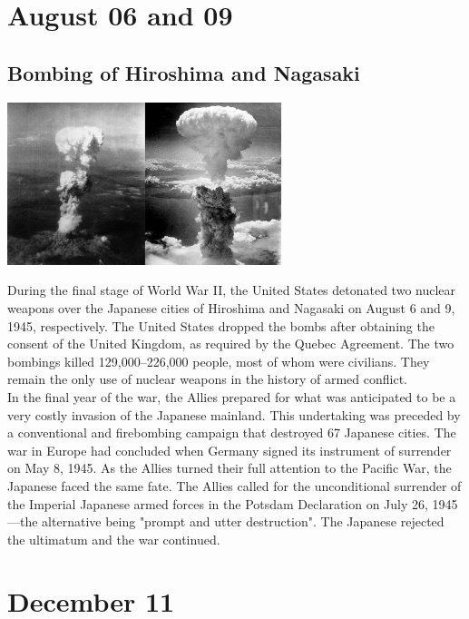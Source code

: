 \documentclass[11pt]{report}
\begin{document}
\section{August 06 and 09}
\subsection{Bombing of Hiroshima and Nagasaki}
\vspace{2mm}\begin{center}\includegraphics[width=8cm]{./img/hiroNagabombing.jpg}\end{center}
During the final stage of World War II, the United States detonated two nuclear weapons over the Japanese cities of Hiroshima and Nagasaki on August 6 and 9, 1945, respectively. The United States dropped the bombs after obtaining the consent of the United Kingdom, as required by the Quebec Agreement. The two bombings killed 129,000–226,000 people, most of whom were civilians. They remain the only use of nuclear weapons in the history of armed conflict.\\
\indent In the final year of the war, the Allies prepared for what was anticipated to be a very costly invasion of the Japanese mainland. This undertaking was preceded by a conventional and firebombing campaign that destroyed 67 Japanese cities. The war in Europe had concluded when Germany signed its instrument of surrender on May 8, 1945. As the Allies turned their full attention to the Pacific War, the Japanese faced the same fate. The Allies called for the unconditional surrender of the Imperial Japanese armed forces in the Potsdam Declaration on July 26, 1945—the alternative being "prompt and utter destruction". The Japanese rejected the ultimatum and the war continued.
\section{December 11}
\end{document}
